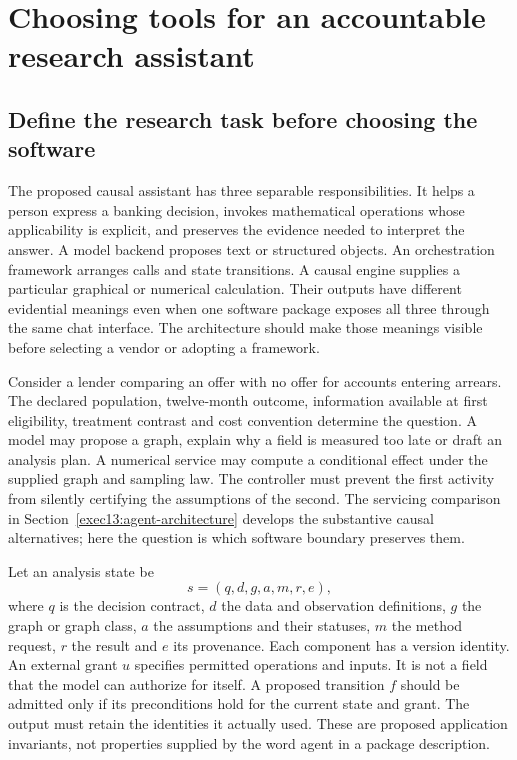\chapter{Choosing tools for an accountable research assistant}
\label{exec14:l6}
\label{ch:la05-prototype}

\section{Define the research task before choosing the software}

The proposed causal assistant has three separable responsibilities. It helps
a person express a banking decision, invokes mathematical operations whose
applicability is explicit, and preserves the evidence needed to interpret the
answer. A model backend proposes text or structured objects. An orchestration
framework arranges calls and state transitions. A causal engine supplies a
particular graphical or numerical calculation. Their outputs have different
evidential meanings even when one software package exposes all three through
the same chat interface. The architecture should make those meanings visible
before selecting a vendor or adopting a framework.

Consider a lender comparing an offer with no offer for accounts entering
arrears. The declared population, twelve-month outcome, information available
at first eligibility, treatment contrast and cost convention determine the
question. A model may propose a graph, explain why a field is measured too
late or draft an analysis plan. A numerical service may compute a conditional
effect under the supplied graph and sampling law. The controller must prevent
the first activity from silently certifying the assumptions of the second.
The servicing comparison in Section~\ref{exec13:agent-architecture} develops
the substantive causal alternatives; here the question is which software
boundary preserves them.

Let an analysis state be
\begin{equation}
 s=(q,d,g,a,m,r,e),
 \label{exec14:l6-state}
\end{equation}
where $q$ is the decision contract, $d$ the data and observation definitions,
$g$ the graph or graph class, $a$ the assumptions and their statuses, $m$ the
method request, $r$ the result and $e$ its provenance. Each component has a
version identity. An external grant $u$ specifies permitted operations and
inputs. It is not a field that the model can authorize for itself. A proposed
transition $f$ should be admitted only if its preconditions hold for the
current state and grant. The output must retain the identities it actually
used. These are proposed application invariants, not properties supplied by
the word agent in a package description. \citep{exec14_l6_design}

